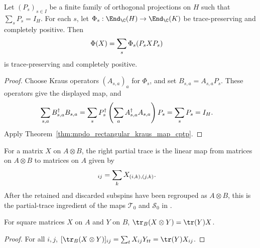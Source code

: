 \begin{theorem}
    \label{thm:mpdo_projective_resolution_channel_cptp}
    \leanok
    Let $(P_s)_{s\in I}$ be a finite family of orthogonal projections on
    $H$ such that $\sum_sP_s=I_H$. For each $s$, let
    $\Phi_s:\End_{\C}(H)\to\End_{\C}(K)$ be trace-preserving and completely
    positive. Then
    \begin{align}
        \Phi(X)&=\sum_s\Phi_s(P_sXP_s)
        \notag
    \end{align}
    is trace-preserving and completely positive.
\end{theorem}
\begin{proof}
    \leanok
    Choose Kraus operators $(A_{s,a})_a$ for $\Phi_s$, and set
    $B_{s,a}=A_{s,a}P_s$. These operators give the displayed map, and
    \begin{align}
        \sum_{s,a}B_{s,a}^\dagger B_{s,a}
        &=\sum_sP_s^\dagger
          \left(\sum_aA_{s,a}^\dagger A_{s,a}\right)P_s
          =\sum_sP_s=I_H.
        \notag
    \end{align}
    Apply Theorem~\ref{thm:mpdo_rectangular_kraus_map_cptp}.
\end{proof}

\begin{definition}
    \label{def:mpdo_right_partial_trace_map}
    \leanok
    For a matrix $X$ on $A\otimes B$, the right partial trace is the linear map
    from matrices on $A\otimes B$ to matrices on $A$ given by
    \begin{align}
        [\tr_B(X)]_{ij}
        &=\sum_k X_{(i,k),(j,k)}.
        \notag
    \end{align}
    After the retained and discarded subspins have been regrouped as
    $A\otimes B$, this is the partial-trace ingredient of the maps
    $\mathcal T_0$ and $\mathcal S_0$ in
    \cite[Appendix~C.2, lines~1521--1522 and~1547]{Cirac2016MPDO_arXiv}.
\end{definition}

\begin{theorem}
    \label{thm:mpdo_right_partial_trace_kronecker}
    \leanok
    For square matrices $X$ on $A$ and $Y$ on $B$,
    $\tr_B(X\otimes Y)=\tr(Y)X$.
\end{theorem}
\begin{proof}
    \leanok
    For all $i,j$,
    $[\tr_B(X\otimes Y)]_{ij}
    =\sum_t X_{ij}Y_{tt}=\tr(Y)X_{ij}$.
\end{proof}

